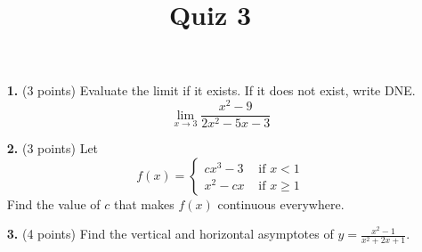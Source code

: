 \documentclass[12pt]{amsart}
\title{Quiz 3}
\begin{document}
\maketitle
\thispagestyle{fancy}

\vskip0.25in
\begin{enumerate}

\item[\textbf{1. }](3 points) Evaluate the limit if it exists.  If it does not exist, write DNE.
  $$\lim_{x \to 3}  \frac{x^2 - 9}{2x^2 -5x - 3}$$
 
\vskip 2in

  \item[\textbf{2. }] (3 points) Let
\[
f(x) = \begin{cases} 
cx^3 - 3 & \text{ if } x < 1 \\
x^2 - cx  & \text{ if } x \ge 1
\end{cases} 
\]
Find the value of $c$ that makes $f(x)$ continuous everywhere.



\vskip 2in

\item[\textbf{3. }](4 points) Find the vertical and horizontal asymptotes of $\displaystyle y = \frac {x^2 - 1} {x^2 + 2x + 1}$.





\end{enumerate}
\end{document}
